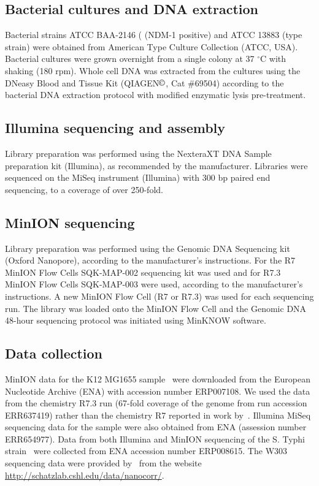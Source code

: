 \subsection{Bacterial cultures and DNA extraction}
Bacterial strains \kp{} ATCC BAA-2146 ( (NDM-1 positive) and ATCC 13883
(type strain) were obtained from American Type Culture Collection (ATCC, USA).
Bacterial cultures were grown overnight from a single colony at 37 $^{\circ}$C
with shaking (180 rpm). Whole cell DNA was extracted from the cultures using the DNeasy Blood and Tissue Kit
(QIAGEN$\copyright$, Cat \#69504) according to the bacterial DNA extraction
protocol with modified enzymatic lysis pre-treatment.

\subsection{Illumina sequencing and assembly} 
Library preparation was performed using the NexteraXT DNA Sample preparation kit 
(Illumina), as recommended by the manufacturer. Libraries were sequenced on the 
MiSeq instrument (Illumina) with 300 bp paired end sequencing, to a coverage of
over 250-fold. 

\subsection{MinION sequencing}
Library preparation was performed using the Genomic DNA Sequencing kit 
(Oxford Nanopore), according to the manufacturer's instructions. 
For the R7 MinION Flow Cells SQK-MAP-002 sequencing kit was used and for 
R7.3 MinION Flow Cells SQK-MAP-003 were used, according to the manufacturer's
instructions. A new MinION Flow Cell (R7 or R7.3) was used for each sequencing run. 
The library was loaded onto the MinION Flow Cell and the 
Genomic DNA 48-hour sequencing protocol was initiated using MinKNOW software.


\subsection{Data collection}
MinION data for the \ec{} K12 MG1655 sample~\cite{LomanQ2014} were downloaded
from the European Nucleotide Archive (ENA) with accession number ERP007108. We used the
data from the chemistry R7.3 run (67-fold coverage of the genome from run
accession ERR637419) rather than the chemistry R7 reported in work
by~\cite{GoodwinGE2015, WarrenYV2015, MadouiEC2015}. Illumina MiSeq sequencing
data for the sample were also obtained from ENA (assession number ERR654977). 
Data from both Illumina and MinION sequencing of the S. Typhi 
strain~\cite{AshtonND2015} were collected from ENA
accession number ERP008615. The \sce{} W303 sequencing data were
provided by~\cite{GoodwinGE2015} from the website
\url{http://schatzlab.cshl.edu/data/nanocorr/}.


